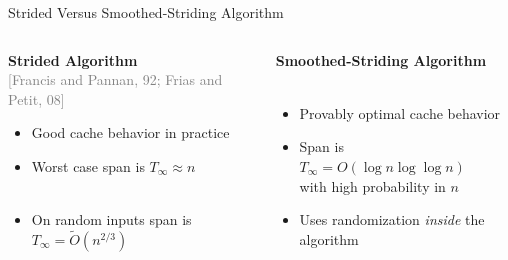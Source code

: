 \documentclass[table,serif,mathserif,final]{beamer}
\newcommand{\citefont}[1]{{\huge \textcolor{gray}{#1}}}
\theoremstyle{remark}
\begin{document}
\begin{frame}{}
\begin{columns}[t]
\begin{column}{0.5\linewidth}
\begin{block}{\Huge Strided Versus Smoothed-Striding Algorithm}
  \Huge
	\begin{columns}[T] %
	\begin{column}{.45\textwidth}
		\textbf{Strided Algorithm}\\\citefont{[Francis and Pannan, 92; Frias and Petit, 08]}\\
		\vspace{0.25cm}
		\begin{itemize}
			\item Good cache behavior in practice\\\hfill
			\item Worst case span is $T_\infty \approx n$\\\hfill\\\hfill
			\item On random inputs span is $T_\infty = \tilde{O}(n^{2/3})$
		\end{itemize}
	\end{column}
	\hfill
	\begin{column}{.55\textwidth}
		\textbf{Smoothed-Striding Algorithm}\\\citefont{}\\
		\vspace{0.25cm}
		\begin{itemize}
			\item Provably optimal cache behavior\\\hfill
			\item Span is \\$T_\infty = O(\log n \log\log n)$\\ with high probability in $n$\\\hfill
			\item Uses randomization \emph{inside} the algorithm %
		\end{itemize}
	\end{column}
	\end{columns}

\end{block}

  \end{column}


\end{columns}
\end{frame}
\end{document}
